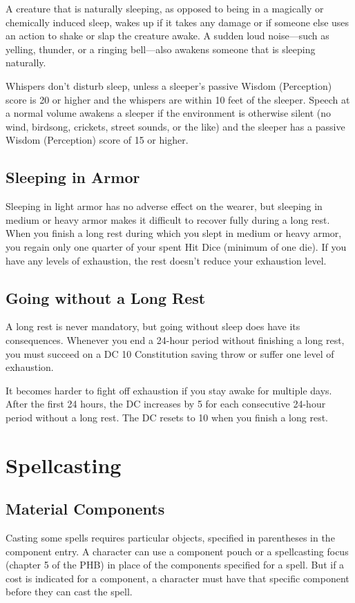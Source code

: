 \documentclass[a4paper,10pt,twoside,twocolumn,openany,bg=none,nodeprecatedcode]{dndarticle}
\begin{document}
A creature that is naturally sleeping, as opposed to being in a magically or chemically induced sleep, wakes up if it takes any damage or if someone else uses an action to shake or slap the creature awake. A sudden loud noise—such as yelling, thunder, or a ringing bell—also awakens someone that is sleeping naturally.

Whispers don't disturb sleep, unless a sleeper's passive Wisdom (Perception) score is 20 or higher and the whispers are within 10 feet of the sleeper. Speech at a normal volume awakens a sleeper if the environment is otherwise silent (no wind, birdsong, crickets, street sounds, or the like) and the sleeper has a passive Wisdom (Perception) score of 15 or higher.

\subsection{Sleeping in Armor}

Sleeping in light armor has no adverse effect on the wearer, but sleeping in medium or heavy armor makes it difficult to recover fully during a long rest. When you finish a long rest during which you slept in medium or heavy armor, you regain only one quarter of your spent Hit Dice (minimum of one die). If you have any levels of exhaustion, the rest doesn't reduce your exhaustion level.

\subsection{Going without a Long Rest}

A long rest is never mandatory, but going without sleep does have its consequences. Whenever you end a 24-hour period without finishing a long rest, you must succeed on a DC 10 Constitution saving throw or suffer one level of exhaustion.

It becomes harder to fight off exhaustion if you stay awake for multiple days. After the first 24 hours, the DC increases by 5 for each consecutive 24-hour period without a long rest. The DC resets to 10 when you finish a long rest.

\vfill
\section{Spellcasting}
\subsection{Material Components}
Casting some spells requires particular objects, specified in parentheses in the component entry. A character can use a component pouch or a spellcasting focus (chapter 5 of the PHB) in place of the components specified for a spell. But if a cost is indicated for a component, a character must have that specific component before they can cast the spell.
\end{document}
